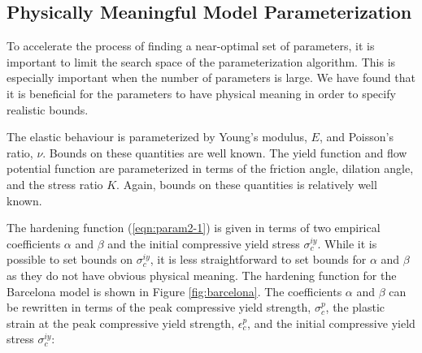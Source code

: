 \subsection{Physically Meaningful Model Parameterization}
To accelerate the process of finding a near-optimal set of parameters, it is important to limit the search space of the parameterization algorithm. This is especially important when the number of parameters is large. We have found that it is beneficial for the parameters to have physical meaning in order to specify realistic bounds.

The elastic behaviour is parameterized by Young's modulus, $E$, and Poisson's ratio, $\nu$. Bounds on these quantities are well known. The yield function and flow potential function are parameterized in terms of the friction angle, dilation angle, and the stress ratio $K$. Again, bounds on these quantities is relatively well known.

The hardening function (\ref{eqn:param2-1}) is given in terms of two empirical coefficients $\alpha$ and $\beta$ and the initial compressive yield stress $\sigma_c^{iy}$.  While it is possible to set bounds on $\sigma_c^{iy}$, it is less straightforward to set bounds for $\alpha$ and $\beta$ as they do not have obvious physical meaning. The hardening function for the Barcelona model is shown in Figure \ref{fig:barcelona}. The coefficients $\alpha$ and $\beta$ can be rewritten in terms of the peak compressive yield strength, $\sigma_{c}^{p}$, the plastic strain at the peak compressive yield strength, $\epsilon_c^{p}$, and the initial compressive yield stress $\sigma_c^{iy}$:
